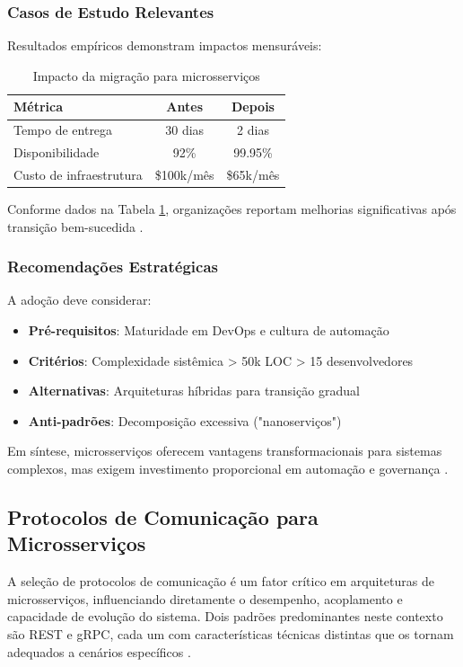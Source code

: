 \subsubsection{Casos de Estudo Relevantes}
Resultados empíricos demonstram impactos mensuráveis:

\begin{table}[h]
\centering
\caption{Impacto da migração para microsserviços}
\begin{tabular}{|l|c|c|}
\hline
\textbf{Métrica} & \textbf{Antes} & \textbf{Depois} \\
\hline
Tempo de entrega & 30 dias & 2 dias \\
Disponibilidade & 92\% & 99.95\% \\
Custo de infraestrutura & \$100k/mês & \$65k/mês \\
\hline
\end{tabular}
\label{tab:impacto}
\end{table}

Conforme dados na Tabela \ref{tab:impacto}, organizações reportam melhorias significativas após transição bem-sucedida \cite{farhan2023performance, shekhar2023microservices}.

\subsubsection{Recomendações Estratégicas}
A adoção deve considerar:

\begin{itemize}
    \item \textbf{Pré-requisitos}: Maturidade em DevOps e cultura de automação
    \item \textbf{Critérios}: Complexidade sistêmica > 50k LOC > 15 desenvolvedores
    \item \textbf{Alternativas}: Arquiteturas híbridas para transição gradual
    \item \textbf{Anti-padrões}: Decomposição excessiva ("nanoserviços")
\end{itemize}

Em síntese, microsserviços oferecem vantagens transformacionais para sistemas complexos, mas exigem investimento proporcional em automação e governança \cite{nizami2020comparison, observability2023}.

\subsection{Protocolos de Comunicação para Microsserviços}
A seleção de protocolos de comunicação é um fator crítico em arquiteturas de microsserviços, influenciando diretamente o desempenho, acoplamento e capacidade de evolução do sistema. Dois padrões predominantes neste contexto são \gls{REST} e \gls{gRPC}, cada um com características técnicas distintas que os tornam adequados a cenários específicos \cite{niswar2023performance}.

